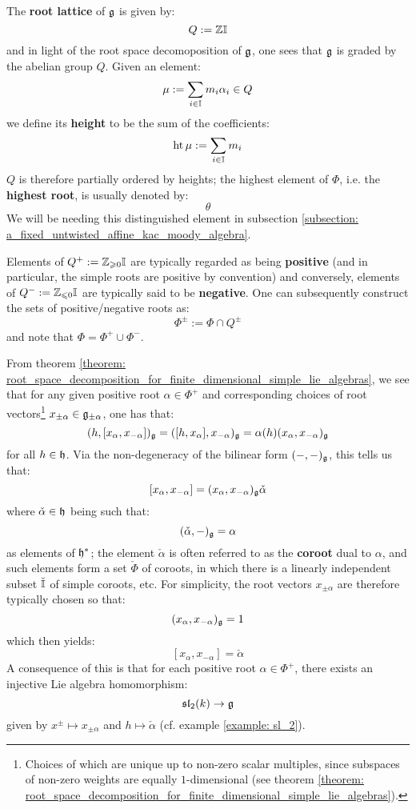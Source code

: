         The \textbf{root lattice} of $\mathfrak{g}$ is given by:
            $$Q := \mathbb{Z} \mathbb{I}$$
        and in light of the root space decomoposition of $\mathfrak{g}$, one sees that $\mathfrak{g}$ is graded by the abelian group $Q$. Given an element:
            $$\mu := \sum_{i \in \mathbb{I}} m_i \alpha_i \in Q$$
        we define its \textbf{height} to be the sum of the coefficients:
            $$\operatorname{ht} \mu := \sum_{i \in \mathbb{I}} m_i$$
        $Q$ is therefore partially ordered by heights; the highest element of $\Phi$, i.e. the \textbf{highest root}, is usually denoted by:
            $$\theta$$
        We will be needing this distinguished element in subsection \ref{subsection: a_fixed_untwisted_affine_kac_moody_algebra}.

        Elements of $Q^+ := \mathbb{Z}_{\geqslant 0} \mathbb{I}$ are typically regarded as being \textbf{positive} (and in particular, the simple roots are positive by convention) and conversely, elements of $Q^- := \mathbb{Z}_{\leqslant 0} \mathbb{I}$ are typically said to be \textbf{negative}. One can subsequently construct the sets of positive/negative roots as:
            $$\Phi^{\pm} := \Phi \cap Q^{\pm}$$
        and note that $\Phi = \Phi^+ \cup \Phi^-$.

        From theorem \ref{theorem: root_space_decomposition_for_finite_dimensional_simple_lie_algebras}, we see that for any given positive root $\alpha \in \Phi^+$ and corresponding choices of root vectors\footnote{Choices of which are unique up to non-zero scalar multiples, since subspaces of non-zero weights are equally $1$-dimensional (see theorem \ref{theorem: root_space_decomposition_for_finite_dimensional_simple_lie_algebras}).} $x_{\pm\alpha} \in \mathfrak{g}_{\pm\alpha}$, one has that:
            $$(h, [x_{\alpha}, x_{-\alpha}])_{\mathfrak{g}} = ([h, x_{\alpha}], x_{-\alpha})_{\mathfrak{g}} = \alpha(h) (x_{\alpha}, x_{-\alpha})_{\mathfrak{g}}$$
        for all $h \in \mathfrak{h}$. Via the non-degeneracy of the bilinear form $(-, -)_{\mathfrak{g}}$, this tells us that:
            $$[x_{\alpha}, x_{-\alpha}] = (x_{\alpha}, x_{-\alpha})_{\mathfrak{g}} \check{\alpha}$$
        where $\check{\alpha} \in \mathfrak{h}$ being such that:
            $$(\check{\alpha}, -)_{\mathfrak{g}} = \alpha$$
        as elements of $\mathfrak{h}^*$; the element $\check{\alpha}$ is often referred to as the \textbf{coroot} dual to $\alpha$, and such elements form a set $\check{\Phi}$ of coroots, in which there is a linearly independent subset $\check{\mathbb{I}}$ of simple coroots, etc. For simplicity, the root vectors $x_{\pm \alpha}$ are therefore typically chosen so that:
            $$(x_{\alpha}, x_{-\alpha})_{\mathfrak{g}} = 1$$
        which then yields:
            $$[x_{\alpha}, x_{-\alpha}] = \check{\alpha}$$
        A consequence of this is that for each positive root $\alpha \in \Phi^+$, there exists an injective Lie algebra homomorphism:
            $$\mathfrak{sl}_2(k) \to \mathfrak{g}$$
        given by $x^{\pm} \mapsto x_{\pm \alpha}$ and $h \mapsto \check{\alpha}$ (cf. example \ref{example: sl_2}).
        
